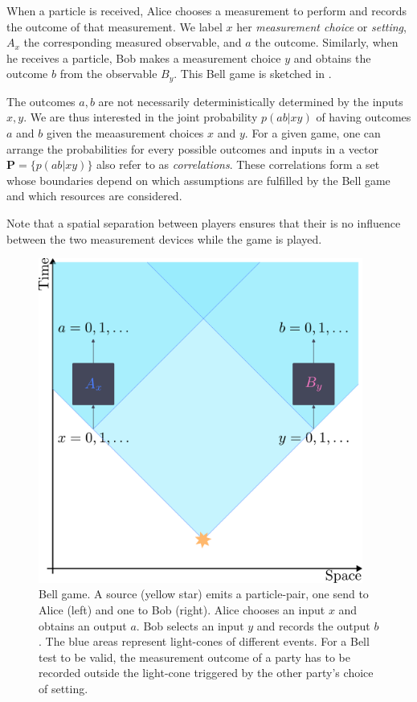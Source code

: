 When a particle is received, Alice chooses a measurement to perform and records the outcome of that measurement.
We label $x$ her \textit{measurement choice} or \textit{setting}, $A_x$ the corresponding measured observable, and $a$ the outcome.
Similarly, when he receives a particle, Bob makes a measurement choice $y$ and obtains the outcome $b$ from the observable $B_y$.
This Bell game is sketched in .

The outcomes $a,b$ are not necessarily deterministically determined by the inputs $x,y$. 
We are thus interested in the joint probability $p(ab|xy)$ of having outcomes $a$ and $b$ given the meaasurement choices $x$ and $y$. 
For a given game, one can arrange the probabilities for every possible outcomes and inputs in a vector $\mathbf{P}=\{ p(ab|xy)\}$ also refer to as \textit{correlations}.
These correlations form a set whose boundaries depend on which assumptions are fulfilled by the Bell game and which resources are considered.

Note that a spatial separation between players ensures that their is no influence between the two measurement devices while the game is played.

\begin{figure}
	\begin{center}
		\includegraphics[width=0.95\textwidth]{chapters/overview/img/belltest.pdf}
	\end{center}
	\caption{Bell game. A source (yellow star) emits a particle-pair, one send to Alice (left) and one to Bob (right). Alice chooses an input $x$ and obtains an output $a$. Bob selects an input $y$ and records the output $b$. The blue areas represent light-cones of different events. For a Bell test to be valid, the measurement outcome of a party has to be recorded outside the light-cone triggered by the other party's choice of setting. }
	\label{fig:belltest}
\end{figure}


